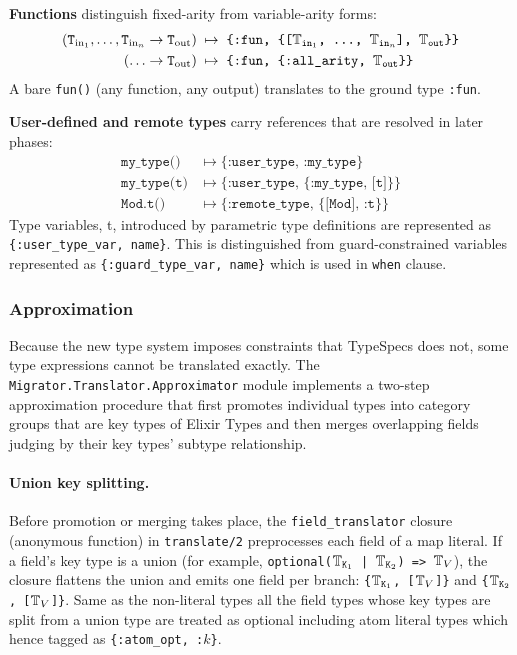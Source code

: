 \medskip
\noindent\textbf{Functions} distinguish fixed-arity from variable-arity forms:
\begin{align*}
  (\texttt{T}_{\text{in}_1}, \ldots, \texttt{T}_{\text{in}_n} \to \texttt{T}_\text{out})
    &\;\mapsto\; \texttt{\{:fun, \{[$\mathbb{T}_{\text{in}_1}$, \ldots, $\mathbb{T}_{\text{in}_n}$], $\mathbb{T}_\text{out}$\}\}} \\
  (\ldots \to \texttt{T}_\text{out})
    &\;\mapsto\; \texttt{\{:fun, \{:all\_arity, $\mathbb{T}_\text{out}$\}\}}
\end{align*}
A bare \texttt{fun()} (any function, any output) translates to the ground type \texttt{:fun}.

\medskip
\noindent\textbf{User-defined and remote types} carry references that are resolved in later phases:
\begin{align*}
  \texttt{my\_type()}   &\;\mapsto\; \texttt{\{:user\_type, :my\_type\}}\\
  \texttt{my\_type(t)}  &\;\mapsto\; \texttt{\{:user\_type, \{:my\_type, [t]\}\}}\\
  \texttt{Mod.t()}      &\;\mapsto\; \texttt{\{:remote\_type, \{[Mod], :t\}\}}
\end{align*}
Type variables, t, introduced by parametric type definitions are represented as \texttt{\{:user\_type\_var, name\}}.
This is distinguished from guard-constrained variables represented as \texttt{\{:guard\_type\_var, name\}} which is used in \texttt{when} clause.

\subsubsection{Approximation}\label{sec:approximation}

Because the new type system imposes constraints that TypeSpecs does not, some type expressions cannot be translated exactly.
The \texttt{Migrator.Translator.Approximator} module implements a two-step approximation procedure that first promotes individual types into category groups that are key types of Elixir Types and then merges overlapping fields judging by their key types' subtype relationship.

\paragraph{Union key splitting.}
Before promotion or merging takes place, the \texttt{field\_translator} closure (anonymous function) in \texttt{translate/2} preprocesses each field of a map literal.
If a field's key type is a union (for example, \texttt{optional($\mathbb{T}_{\texttt{K}_1}$ | $\mathbb{T}_{\texttt{K}_2}$) => $\mathbb{T}_V$}), the closure flattens the union and emits one field per branch: \texttt{\{$\mathbb{T}_{\texttt{K}_1}$, [$\mathbb{T}_V$]\}} and \texttt{\{$\mathbb{T}_{\texttt{K}_2}$, [$\mathbb{T}_V$]\}}.
Same as the non-literal types all the field types whose key types are split from a union type are treated as optional including atom literal types which hence tagged as \texttt{\{:atom\_opt, :$k$\}}.

